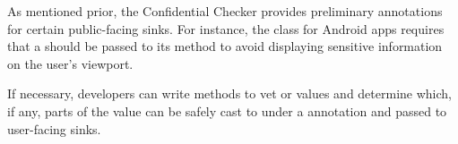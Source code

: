 
As mentioned prior, the Confidential Checker provides preliminary annotations
for certain public-facing sinks. For instance, the  class for Android
apps requires that a  should be passed to
its  method to avoid displaying sensitive information on the user's
viewport.

If necessary, developers can write methods to vet  or
 values and determine which, if any, parts of the
value can be safely cast to  under a 
annotation and passed to user-facing sinks.
